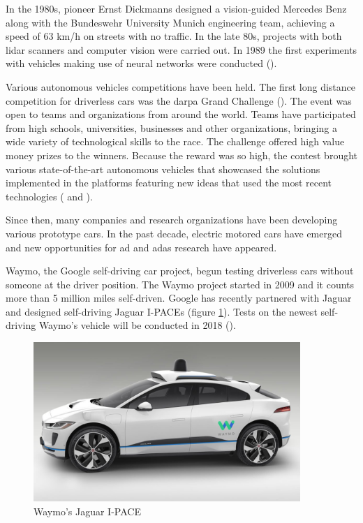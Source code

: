 In the 1980s, pioneer Ernst Dickmanns designed a vision-guided Mercedes Benz along with the Bundeswehr University Munich engineering team, achieving a speed of 63 km/h on streets with no traffic. In the late 80s, projects with both \gls{lidar} scanners and computer vision were carried out. In 1989 the first experiments with vehicles making use of neural networks were conducted (\cite{Pomerleau1989}).

Various autonomous vehicles competitions have been held. The first long distance competition for driverless cars was the \gls{darpa} Grand Challenge (\cite{DARPA}). The event was open to teams and organizations from around the world. Teams have participated from high schools, universities, businesses and other organizations, bringing a wide variety of technological skills to the race. The challenge offered high value money prizes to the winners. Because the reward was so high, the contest brought various state-of-the-art autonomous vehicles that showcased the solutions implemented in the platforms featuring new ideas that used the most recent technologies (\cite{Montemerlo2006} and \cite{Thrun2007}).

Since then, many companies and research organizations have been developing various prototype cars. In the past decade, electric motored cars have emerged and new opportunities for \gls{ad} and \gls{adas} research have appeared. 

Waymo, the Google self-driving car project, begun testing driverless cars without someone at the driver position. The Waymo project started in 2009 and it counts more than 5 million miles self-driven. Google has recently partnered with Jaguar and designed self-driving Jaguar I-PACEs (figure \ref{fig:waymo}). Tests on the newest self-driving Waymo's vehicle will be conducted in 2018 (\cite{Waymo}).


\begin{figure}[htp]
	
	\centering
	\includegraphics[width=0.9\textwidth]{capstate/imgs/waymo}
	
	\caption{Waymo's Jaguar I-PACE \cite{Waymo}}
		\label{fig:waymo}
	
\end{figure}

